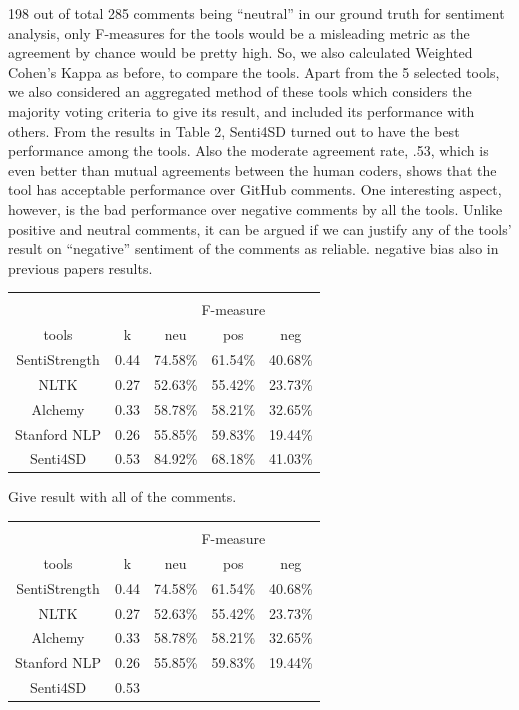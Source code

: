 198 out of total 285 comments being “neutral” in our ground truth for sentiment analysis, only F-measures for the tools would be a misleading metric as the agreement by chance would be pretty high. So, we also calculated Weighted Cohen’s Kappa as before, to compare the tools. Apart from the 5 selected tools, we also considered an aggregated method of these tools which considers the majority voting criteria to give its result, and included its performance with others.
From the results in Table 2, Senti4SD turned out to have the best performance among the tools. Also the moderate agreement rate, .53, which is even better than mutual agreements between the human coders, shows that the tool has acceptable performance over GitHub comments.
One interesting aspect, however, is the bad performance over negative comments by all the tools. Unlike positive and neutral comments, it can be argued if we can justify any of the tools’ result on “negative” sentiment of the comments as reliable.
negative bias also in previous papers results. 
\begin{tabular}{ccccc}
& & & & \\
\multicolumn{2}{c}{ } & \multicolumn{3}{c}{ F-measure } \\
tools & k & neu & pos & neg \\
SentiStrength & 0.44 & 74.58\% & 61.54\% & 40.68\% \\
NLTK & 0.27 & 52.63\% & 55.42\% & 23.73\% \\
Alchemy & 0.33 & 58.78\% & 58.21\% & 32.65\% \\
Stanford NLP & 0.26 & 55.85\% & 59.83\% & 19.44\% \\
Senti4SD & 0.53 & 84.92\% & 68.18\% & 41.03\% \\
\end{tabular}

Give result with all of the comments.

\begin{tabular}{ccccc}
& & & & \\
\multicolumn{2}{c}{ } & \multicolumn{3}{c}{ F-measure } \\
tools & k & neu & pos & neg \\
SentiStrength & 0.44 & 74.58\% & 61.54\% & 40.68\% \\
NLTK & 0.27 & 52.63\% & 55.42\% & 23.73\% \\
Alchemy & 0.33 & 58.78\% & 58.21\% & 32.65\% \\
Stanford NLP & 0.26 & 55.85\% & 59.83\% & 19.44\% \\
Senti4SD & 0.53
\end{tabular}

